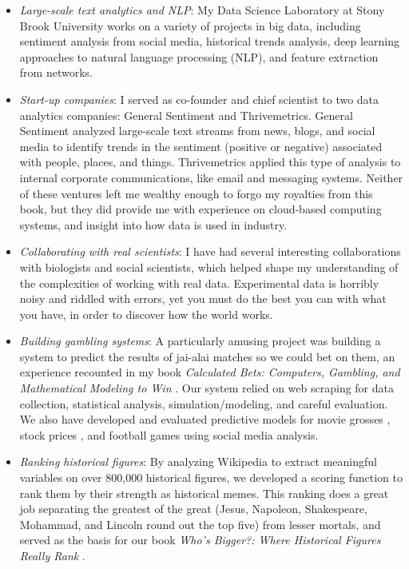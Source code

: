 \documentclass[10pt]{article}
\begin{document}
\begin{itemize}
    \item \textit{Large-scale text analytics and NLP}: My Data Science Laboratory at Stony Brook University works on a variety of projects in big data, including sentiment analysis from social media, historical trends analysis, deep learning approaches to natural language processing (NLP), and feature extraction from networks.
    \item \textit{Start-up companies}: I served as co-founder and chief scientist to two data analytics companies: General Sentiment and Thrivemetrics. General Sentiment analyzed large-scale text streams from news, blogs, and social media to identify trends in the sentiment (positive or negative) associated with people, places, and things. Thrivemetrics applied this type of analysis to internal corporate communications, like email and messaging systems. Neither of these ventures left me wealthy enough to forgo my royalties from this book, but they did provide me with experience on cloud-based computing systems, and insight into how data is used in industry.
    \item \textit{Collaborating with real scientists}: I have had several interesting collaborations with biologists and social scientists, which helped shape my understanding of the complexities of working with real data. Experimental data is horribly noisy and riddled with errors, yet you must do the best you can with what you have, in order to discover how the world works.
    \item \textit{Building gambling systems}: A particularly amusing project was building a system to predict the results of jai-alai matches so we could bet on them, an experience recounted in my book \textit{Calculated Bets: Computers, Gambling, and Mathematical Modeling to Win} \cite{Ski01}. Our system relied on web scraping for data collection, statistical analysis, simulation/modeling, and careful evaluation. We also have developed and evaluated predictive models for movie grosses \cite{ZS09}, stock prices \cite{ZS10}, and football games \cite{HS10} using social media analysis.
    \item \textit{Ranking historical figures}: By analyzing Wikipedia to extract meaningful variables on over 800,000 historical figures, we developed a scoring function to rank them by their strength as historical memes. This ranking does a great job separating the greatest of the great (Jesus, Napoleon, Shakespeare, Mohammad, and Lincoln round out the top five) from lesser mortals, and served as the basis for our book \textit{Who's Bigger?: Where Historical Figures Really Rank} \cite{SW13}.
\end{itemize}
\end{document}
